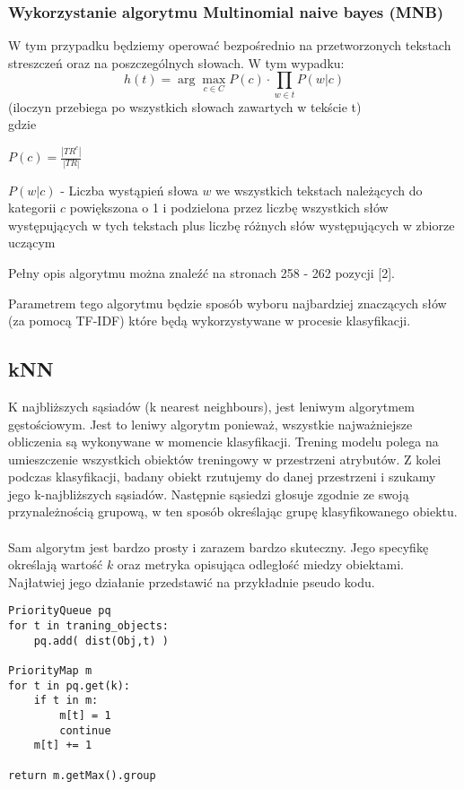 \documentclass[a4paper,12pt]{article}
\begin{document}
	\subsubsection{Wykorzystanie algorytmu Multinomial naive bayes (MNB)}
		W tym przypadku będziemy operować bezpośrednio na 
		przetworzonych tekstach streszczeń oraz na 
		poszczególnych słowach.
		W tym wypadku:
		\[ h(t) = \arg\max_{c \in C}{
			P(c) \cdot \prod_{w \in t} P(w|c)	
		} \]
		(iloczyn przebiega po wszystkich słowach zawartych
		w tekście t)\\
		gdzie
		\begin{list}{}{}
		\item
			$P(c) = \frac{|TR^c|}{|TR|}$
		\item
			$P(w|c)$ - Liczba wystąpień słowa $w$ we wszystkich tekstach należących do kategorii $c$ powiększona o 1 i podzielona 
			przez liczbę wszystkich słów występujących w tych
			tekstach plus liczbę różnych słów występujących w 
			zbiorze uczącym
		\end{list}

		Pełny opis algorytmu można znaleźć  na stronach 258 - 262
		pozycji [2].
		
		Parametrem tego algorytmu będzie sposób wyboru najbardziej
		znaczących słów (za pomocą TF-IDF) które będą wykorzystywane
		w procesie klasyfikacji.
	
\subsection{kNN}
K najbliższych sąsiadów (k nearest neighbours), jest leniwym algorytmem
gęstościowym. Jest to leniwy algorytm ponieważ, wszystkie najważniejsze
obliczenia są wykonywane w momencie klasyfikacji. Trening modelu polega na
umieszczenie wszystkich obiektów treningowy w przestrzeni atrybutów. Z kolei
podczas klasyfikacji, badany obiekt rzutujemy do danej przestrzeni i szukamy
jego k-najbliższych sąsiadów. Następnie sąsiedzi głosuje zgodnie ze swoją
przynależnością grupową, w ten sposób określając grupę klasyfikowanego
obiektu. 

\paragraph{} Sam algorytm jest bardzo prosty i zarazem bardzo skuteczny. Jego
specyfikę określają wartość $k$ oraz metryka opisująca odległość miedzy
obiektami. Najłatwiej jego działanie przedstawić na przykładnie pseudo kodu.

\begin{verbatim}
PriorityQueue pq
for t in traning_objects:
    pq.add( dist(Obj,t) )

PriorityMap m
for t in pq.get(k):
    if t in m:
        m[t] = 1
        continue
    m[t] += 1 

return m.getMax().group
\end{verbatim}
\end{document}
